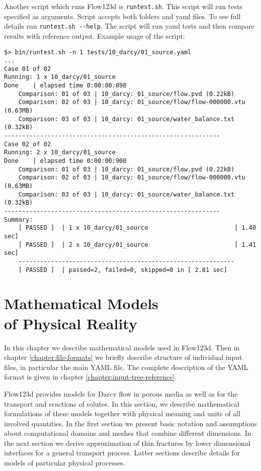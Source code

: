 \documentclass[12pt,a4paper]{report}
\begin{document}
Another script which runs Flow123d is \verb'runtest.sh'. This script will run tests specified as arguments. Script accepts both folders
and yaml files. To see full details run \verb'runtest.sh --help'. The script will run yaml tests and then compare results with reference
output. Example usage of the script:

\begin{verbatim}
$> bin/runtest.sh -n 1 tests/10_darcy/01_source.yaml 
...
Case 01 of 02
Running: 1 x 10_darcy/01_source
Done    | elapsed time 0:00:00:898                                              
    Comparison: 01 of 03 | 10_darcy: 01_source/flow.pvd (0.22kB)
    Comparison: 02 of 03 | 10_darcy: 01_source/flow/flow-000000.vtu (0.63MB)
    Comparison: 03 of 03 | 10_darcy: 01_source/water_balance.txt (0.32kB)
------------------------------------------------------------
Case 02 of 02
Running: 2 x 10_darcy/01_source
Done    | elapsed time 0:00:00:900                                              
    Comparison: 01 of 03 | 10_darcy: 01_source/flow.pvd (0.22kB)
    Comparison: 02 of 03 | 10_darcy: 01_source/flow/flow-000000.vtu (0.63MB)
    Comparison: 03 of 03 | 10_darcy: 01_source/water_balance.txt (0.32kB)
------------------------------------------------------------
Summary: 
    [ PASSED ]  | 1 x 10_darcy/01_source                        [ 1.40 sec] 
    [ PASSED ]  | 2 x 10_darcy/01_source                        [ 1.41 sec] 
    ------------------------------------------------------------
    [ PASSED ]  | passed=2, failed=0, skipped=0 in [ 2.81 sec]

\end{verbatim}










\chapter[Mathematical Models of Physical Reality]{Mathematical Models \\of Physical Reality}
\label{chapter:mathematical_models}

In this chapter we describe mathematical models used in Flow123d.
Then in chapter \ref{chapter:file-formats} we briefly describe structure of individual input files, in particular the main YAML file.
The complete description of the YAML format is given in chapter \ref{chapter:input-tree-reference}.

Flow123d provides models for Darcy flow in porous media as well as for the transport and reactions of solutes. In this section, we describe 
mathematical formulations of these models together with physical meaning and units of all involved quantities. In the first section we present 
basic notation and assumptions about computational domains and meshes that combine different dimensions. In the next section we
derive approximation of thin fractures by lower dimensional interfaces for a general transport process. Latter sections describe details for models of particular
physical processes.
\end{document}
